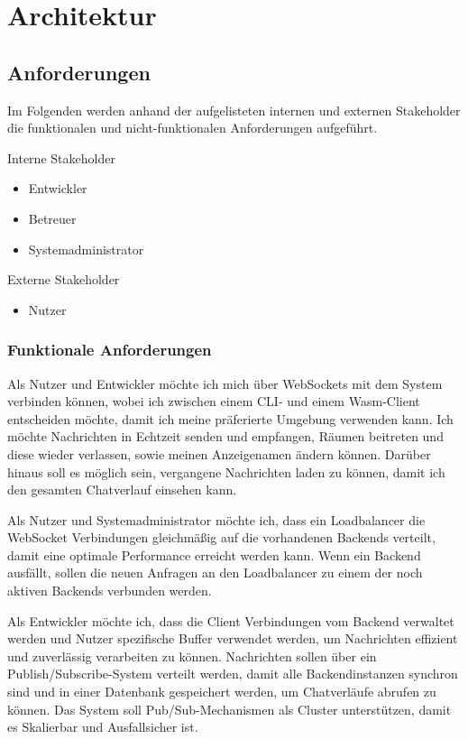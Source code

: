 
\chapter{Architektur}

\section{Anforderungen}

Im Folgenden werden anhand der aufgelisteten internen und externen Stakeholder die funktionalen und nicht-funktionalen Anforderungen aufgeführt.

Interne Stakeholder

\begin{itemize}
  \item Entwickler
  \item Betreuer
  \item Systemadministrator
\end{itemize}

Externe Stakeholder
\begin{itemize}
  \item Nutzer
\end{itemize}

\subsection{Funktionale Anforderungen}
\begin{description}[style=nextline]
    \item [Client Kommunikation] 
      Als Nutzer und Entwickler möchte ich mich über WebSockets mit dem System verbinden können, wobei ich zwischen einem \ac{CLI}- und einem \ac{Wasm}-Client entscheiden möchte, damit ich meine präferierte Umgebung verwenden kann. Ich möchte Nachrichten in Echtzeit senden und empfangen, Räumen beitreten und diese wieder verlassen, sowie meinen Anzeigenamen ändern können. Darüber hinaus soll es möglich sein, vergangene Nachrichten laden zu können, damit ich den gesamten Chatverlauf einsehen kann.
  \item [Loadbalancer]
      Als Nutzer und Systemadministrator möchte ich, dass ein Loadbalancer die WebSocket Verbindungen gleichmäßig auf die vorhandenen Backends verteilt, damit eine optimale Performance erreicht werden kann. Wenn ein Backend ausfällt, sollen die neuen Anfragen an den Loadbalancer zu einem der noch aktiven Backends verbunden werden.
  \item [Backend Services]
      Als Entwickler möchte ich, dass die Client Verbindungen vom Backend verwaltet werden und Nutzer spezifische Buffer verwendet werden, um Nachrichten effizient und zuverlässig verarbeiten zu können. Nachrichten sollen über ein Publish/Subscribe-System verteilt werden, damit alle Backendinstanzen synchron sind und in einer Datenbank gespeichert werden, um Chatverläufe abrufen zu können. Das System soll Pub/Sub-Mechanismen als Cluster unterstützen, damit es Skalierbar und Ausfallsicher ist.
\end{description}
